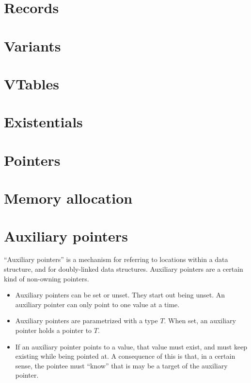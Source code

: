 \documentclass[a4paper]{book}
\begin{document}
\chapter{Records}

\chapter{Variants}
\chapter{VTables}
\chapter{Existentials}

\chapter{Pointers}

\chapter{Memory allocation}


\chapter{Auxiliary pointers}
``Auxiliary pointers'' is a mechanism for referring to locations within
a data structure, and for doubly-linked data structures.
Auxiliary pointers are a certain kind of non-owning pointers.

\begin{itemize}
\item Auxiliary pointers can be set or unset. They start out being unset.
  An auxiliary pointer can only point to one value at a time.
\item Auxiliary pointers are parametrized with a type $T$.
  When set, an auxiliary pointer holds a pointer to $T$.
\item If an auxiliary pointer points to a value, that value must exist,
  and must keep existing while being pointed at.
  A consequence of this is that, in a certain sense, the pointee must ``know''
  that is may be a target of the auxiliary pointer.
\end{itemize}
\end{document}

